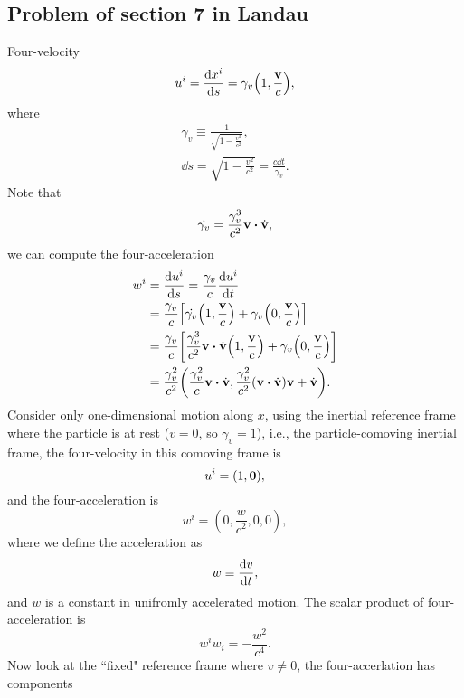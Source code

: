 \documentclass[10pt]{article}
\begin{document}
\begin{enumerate}
	\subsection{Problem of section 7 in Landau}
	Four-velocity
	\begin{equation}
		u^i = \dv{x^i}{s} = \gamma_v \qty(1, \frac{\vb{v}}{c}),
	\end{equation}
	where
	\begin{gather*}
		\gamma_v \equiv \frac{1}{\sqrt{1-\frac{v^2}{c^2}}}, \\
		\dd{s} = \sqrt{1-\frac{v^2}{c^2}} = \frac{c \dd{t}}{\gamma_v}.
	\end{gather*}
	Note that
	\begin{equation}
		\dot{\gamma_v} = \frac{\gamma_v^3}{c^2}\vb{v}\vdot \dot{\vb{v}},
	\end{equation}
	we can compute the four-acceleration
	\begin{align*}
		w^i &= \dv{u^i}{s} = \frac{\gamma_v}{c} \dv{u^i}{t} \\
		&= \frac{\gamma_v}{c} \qty[\dot{\gamma_v}\qty(1,\frac{\vb{v}}{c}) + \gamma_v \qty(0,\frac{\vb{v}}{c})] \\
		&= \frac{\gamma_v}{c} \qty[\frac{\gamma_v^3}{c^2} \vb{v}\vdot \dot{\vb{v}}\qty(1,\frac{\vb{v}}{c}) + \gamma_v \qty(0,\frac{\vb{v}}{c})] \\
		&= \frac{\gamma_v^2}{c^2} \qty(\frac{\gamma_v^2}{c} \vb{v} \vdot \dot{\vb{v}}, \frac{\gamma_v^2}{c^2} (\vb{v} \vdot \dot{\vb{v}}) \vb{v} + \dot{\vb{v}}).
	\end{align*}
	Consider only one-dimensional motion along $x$, using the inertial reference frame where the particle is at rest ($v=0$, so $\gamma_v = 1$), i.e., the particle-comoving inertial frame, the four-velocity in this comoving frame is
	\begin{equation}
		u^i = (1, \vb{0}),
	\end{equation}
	and the four-acceleration is
	\begin{equation}
		w^i = (0, \frac{w}{c^2}, 0, 0),
	\end{equation}
	where we define the acceleration as
	\begin{equation}
		w \equiv \dv{v}{t},
	\end{equation}
	and $w$ is a constant in unifromly accelerated motion. The scalar product of four-acceleration is
	\begin{equation}
		w^i w_i = -\frac{w^2}{c^4}.
	\end{equation}
	Now look at the ``fixed" reference frame where $v \neq 0$, the four-accerlation has components

\end{enumerate}
\end{document}
